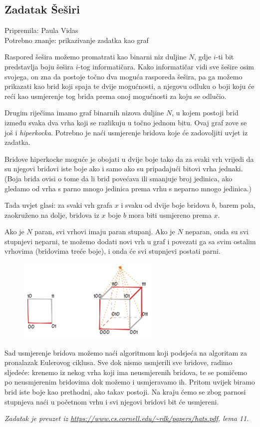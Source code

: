 \subsection*{Zadatak Šeširi}
\textsf{Pripremila: Paula Vidas}\\
\textsf{Potrebno znanje: prikazivanje zadatka kao graf}

Raspored šešira možemo promatrati kao binarni niz duljine $N$, gdje $i$-ti bit
predstavlja boju šešira $i$-tog informatičara.
Kako informatičar vidi sve šešire osim svojega, on zna da postoje točno dva moguća
rasporeda šešira, pa ga možemo prikazati kao brid koji spaja te dvije mogućnosti,
a njegovu odluku o boji koju će reći kao usmjerenje tog brida prema onoj mogućnosti
za koju se odlučio.

Drugim riječima imamo graf binarnih nizova duljine $N$, u kojem postoji brid
između svaka dva vrha koji se razlikuju u točno jednom bitu. Ovaj graf zove se još
i \textit{hiperkocka}. Potrebno je naći usmjerenje bridova koje će zadovoljiti
uvjet iz zadatka.

Bridove hiperkocke moguće je obojati u dvije boje tako da za svaki vrh vrijedi da su njegovi
bridovi iste boje ako i samo ako su pripadajući bitovi vrha jednaki. (Boja brida ovisi o tome
da li brid povećava ili smanjuje broj jedinica, ako gledamo od vrha s parno mnogo jedinica
prema vrhu s neparno mnogo jedinica.)

Tada uvjet glasi: za svaki vrh grafa $x$ i svaku od dvije boje bridova $b$, barem pola,
zaokruženo na dolje, bridova iz $x$ boje $b$ mora biti usmjereno prema $x$.

Ako je $N$ paran, svi vrhovi imaju paran stupanj. Ako je $N$ neparan, onda
su svi stupnjevi neparni, te možemo dodati novi vrh u graf i povezati ga sa svim ostalim
vrhovima (bridovima treće boje), i onda će svi stupnjevi postati parni.

\begin{figure}[H]
    \centering
    \includegraphics[width=0.6\textwidth]{img/sesiri_editorial.excalidraw.png}
\end{figure}

Sad usmjerenje bridova možemo naći algoritmom koji podsjeća na algoritam za pronalazak
Eulerovog ciklusa. Sve dok nismo usmjerili sve bridove, radimo sljedeće: krenemo iz nekog
vrha koji ima neusmjerenih bridova, te se pomičemo po neusmjerenim bridovima dok možemo i usmjeravamo ih.
Pritom uvijek biramo brid iste boje kao prethodni, ako takav postoji.
Na kraju ćemo se zbog parnosi stupnjeva naći u početnom vrhu i svi njegovi bridovi bit će usmjereni.

\bigskip

\textit{Zadatak je preuzet iz \url{https://www.cs.cornell.edu/~rdk/papers/hats.pdf}, lema 11.}
